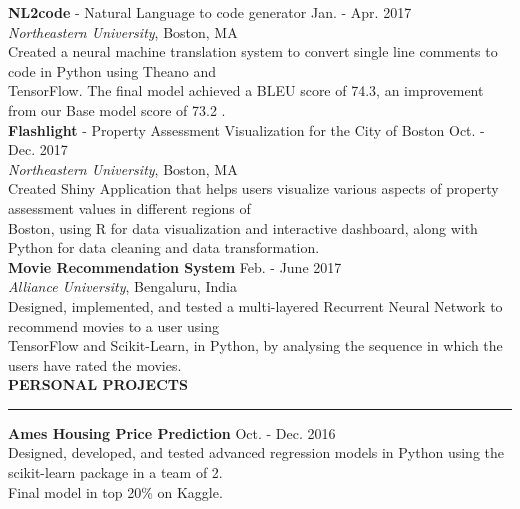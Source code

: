 \documentclass[a4paper]{article}
\newcommand{\myline}{\par
  \kern2pt %
  \hrule height 0.5pt
  \kern2pt %
}
\newcommand{\mybullet}{
	\indent \textbullet \hspace*{2mm}
}
\begin{document}
			\noindent
			\textbf{NL2code} - Natural Language to code generator
			\hfill Jan. - Apr. 2017 \\
			\textit{Northeastern University}, Boston, MA \\
			\mybullet Created a neural machine translation system to convert single line comments 
			to code in Python using Theano and \\ 
			\hspace*{9mm} TensorFlow. The final model achieved a BLEU score of 74.3, an improvement 
			from our Base model score of 73.2 . \\

			\noindent
			\textbf{Flashlight} - Property Assessment Visualization for the City of Boston 
			\hfill Oct. - Dec. 2017 \\
			\textit{Northeastern University}, Boston, MA \\
			\mybullet Created Shiny Application that helps users visualize various aspects of 
			property assessment values in different regions of \\ \hspace*{9mm} Boston, using 
			R for data visualization and interactive dashboard, along with Python for data cleaning 
			and data transformation. \\
			
			\noindent
			\textbf{Movie Recommendation System} \hfill Feb. - June 2017\\
			\textit{Alliance University}, Bengaluru, India \\
			\mybullet Designed, implemented, and tested a multi-layered Recurrent Neural Network 
			to recommend movies to a user using \\ \hspace*{9mm} TensorFlow and Scikit-Learn, 
			in Python, by analysing the sequence in which the users have rated the movies. \\ 

	\noindent
	{\large \textbf{PERSONAL PROJECTS}}
	\myline 
	\smallskip
	
		\noindent
		\textbf{Ames Housing Price Prediction} \hfill Oct. - Dec. 2016 \\
		\mybullet Designed, developed, and tested advanced regression models in Python using 
					the scikit-learn package in a team of 2. \\
		\mybullet Final model in top 20\% on Kaggle. \\
		
	
\end{document}
